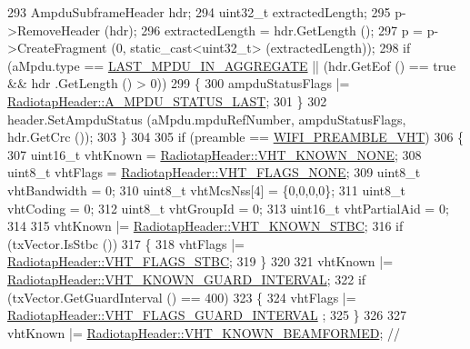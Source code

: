 \begin{DoxyCode}
293             AmpduSubframeHeader hdr;
294             uint32\_t extractedLength;
295             p->RemoveHeader (hdr);
296             extractedLength = hdr.GetLength ();
297             p = p->CreateFragment (0, static\_cast<uint32\_t> (extractedLength));
298             \textcolor{keywordflow}{if} (aMpdu.type == \hyperlink{namespacens3_ae617d41bbd0c07fa58ee2306f687b055a00f5645550d1d4766ba10c4ac229b276}{LAST\_MPDU\_IN\_AGGREGATE} || (hdr.GetEof () == \textcolor{keyword}{true} && hdr
      .GetLength () > 0))
299               \{
300                 ampduStatusFlags |= \hyperlink{classns3_1_1RadiotapHeader_a9f8333ba19c8dc9ae63e7e03af87a557ae15e8d17497685bcc4428548af011f1b}{RadiotapHeader::A\_MPDU\_STATUS\_LAST};
301               \}
302             header.SetAmpduStatus (aMpdu.mpduRefNumber, ampduStatusFlags, hdr.GetCrc ());
303           \}
304 
305         \textcolor{keywordflow}{if} (preamble == \hyperlink{group__wifi_gga5e94a56cb338a14ffbbb19c6a41251ebab90b0fe0b17f27e51c0fe16239e7b089}{WIFI\_PREAMBLE\_VHT})
306           \{
307             uint16\_t vhtKnown = \hyperlink{classns3_1_1RadiotapHeader_a3479bfa57eb27bd6e5eeb2556ab8f5a8a3fab8c5b84a45f60637048bcf0558753}{RadiotapHeader::VHT\_KNOWN\_NONE};
308             uint8\_t vhtFlags = \hyperlink{classns3_1_1RadiotapHeader_a6df30f9a6b9d20263a6e5531377eed5ca68c88b11b4361e729731affcda369704}{RadiotapHeader::VHT\_FLAGS\_NONE};
309             uint8\_t vhtBandwidth = 0;
310             uint8\_t vhtMcsNss[4] = \{0,0,0,0\};
311             uint8\_t vhtCoding = 0;
312             uint8\_t vhtGroupId = 0;
313             uint16\_t vhtPartialAid = 0;
314 
315             vhtKnown |= \hyperlink{classns3_1_1RadiotapHeader_a3479bfa57eb27bd6e5eeb2556ab8f5a8a7d8adf3b395ad622e2ef6824ce609db7}{RadiotapHeader::VHT\_KNOWN\_STBC};
316             \textcolor{keywordflow}{if} (txVector.IsStbc ())
317               \{
318                 vhtFlags |= \hyperlink{classns3_1_1RadiotapHeader_a6df30f9a6b9d20263a6e5531377eed5cadb77d4e25015f2144524a297927dad83}{RadiotapHeader::VHT\_FLAGS\_STBC};
319               \}
320 
321             vhtKnown |= \hyperlink{classns3_1_1RadiotapHeader_a3479bfa57eb27bd6e5eeb2556ab8f5a8a7fc9564ea0ad14f0f62001929f06d3e8}{RadiotapHeader::VHT\_KNOWN\_GUARD\_INTERVAL};
322             \textcolor{keywordflow}{if} (txVector.GetGuardInterval () == 400)
323               \{
324                 vhtFlags |= \hyperlink{classns3_1_1RadiotapHeader_a6df30f9a6b9d20263a6e5531377eed5caf6d5b32fb7e1c0b442c7d4b6c8dc944e}{RadiotapHeader::VHT\_FLAGS\_GUARD\_INTERVAL}
      ;
325               \}
326 
327             vhtKnown |= \hyperlink{classns3_1_1RadiotapHeader_a3479bfa57eb27bd6e5eeb2556ab8f5a8aee35ae1d0986b232b16c5085a351df43}{RadiotapHeader::VHT\_KNOWN\_BEAMFORMED}; \textcolor{comment}{//
}
\end{DoxyCode}
